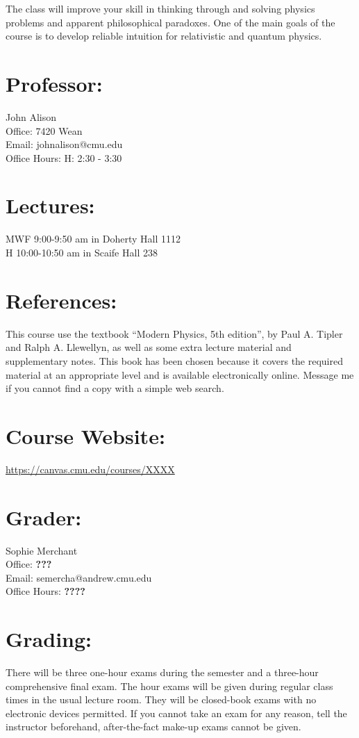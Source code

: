 \documentclass[margin,line]{res}
\newcommand\inRed[1]{{\color{red}  \textbf{#1}}}
\begin{document}
\begin{resume}
The class will improve your skill in thinking through and solving physics problems and apparent philosophical paradoxes.
One of the main goals of the course is to develop reliable intuition for relativistic and quantum physics.



\section{Professor:}
John Alison\\
Office: 7420 Wean\\
Email: johnalison@cmu.edu\\
Office Hours: H: 2:30 - 3:30

\section{Lectures:}
MWF 9:00-9:50 am in Doherty Hall 1112 \\
H  10:00-10:50 am in Scaife Hall 238


\section{References:}
This course use the textbook “Modern Physics, 5th edition”, by Paul A. Tipler and Ralph A. Llewellyn, as well as some extra lecture material and supplementary notes.
This book has been chosen because it covers the required material at an appropriate level and is available electronically online.
Message me if you cannot find a copy with a simple web search.

\section{Course Website:}  
\href{https://canvas.cmu.edu/courses/XXXX}{https://canvas.cmu.edu/courses/XXXX}

\section{Grader:}
Sophie Merchant \\
Office: \inRed{???} \\ 
Email: semercha@andrew.cmu.edu\\
Office Hours: \inRed{????}



\clearpage

\section{Grading:} 
There will be three one-hour exams during the semester and a three-hour comprehensive final exam.
The hour exams will be given during regular class times in the usual lecture room.
They will be closed-book exams with no electronic devices permitted.
If you cannot take an exam for any reason, tell the instructor beforehand, after-the-fact make-up exams cannot be given.


\end{resume}
\end{document}
